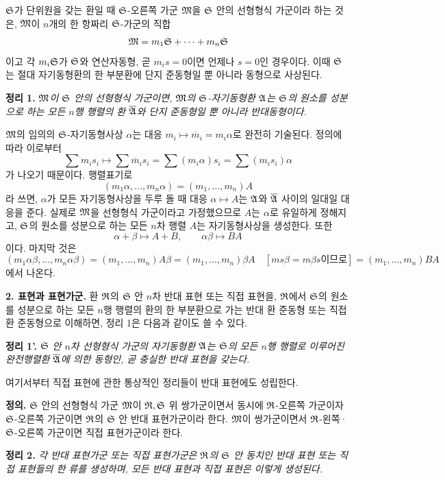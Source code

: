 \(\mathfrak S\)가 단위원을 갖는 환일 때 \(\mathfrak S\)-오른쪽 가군 \(\mathfrak M\)을 \(\mathfrak S\) 안의 선형형식 가군이라 하는 것은, \(\mathfrak M\)이 \(n\)개의 한 항짜리 \(\mathfrak S\)-가군의 직합
\[
\mathfrak M=m_1\mathfrak S+\cdots+m_n\mathfrak S
\]
이고 각 \(m_i\mathfrak S\)가 \(\mathfrak S\)와 연산자동형, 곧 \(m_i s=0\)이면 언제나 \(s=0\)인 경우이다. 이때 \(\mathfrak S\)는 절대 자기동형환의 한 부분환에 단지 준동형일 뿐 아니라 동형으로 사상된다.

\noindent\textbf{정리 1.} \emph{\(\mathfrak M\)이 \(\mathfrak S\) 안의 선형형식 가군이면, \(\mathfrak M\)의 \(\mathfrak S\)-자기동형환 \(\mathfrak A\)는 \(\mathfrak S\)의 원소를 성분으로 하는 모든 \(n\)행 행렬의 환 \(\overline{\mathfrak A}\)와 단지 준동형일 뿐 아니라 반대동형이다.}

\(\mathfrak M\)의 임의의 \(\mathfrak S\)-자기동형사상 \(\alpha\)는 대응 \(m_i\mapsto\overline m_i=m_i\alpha\)로 완전히 기술된다. 정의에 따라 이로부터
\[
\sum m_i s_i\longmapsto
\sum\overline m_i s_i
=\sum(m_i\alpha)s_i
=\sum(m_i s_i)\alpha
\]
가 나오기 때문이다. 행렬표기로
\[
(m_1\alpha,\ldots,m_n\alpha)=(m_1,\ldots,m_n)A
\]
라 쓰면, \(\alpha\)가 모든 자기동형사상을 두루 돌 때 대응 \(\alpha\mapsto A\)는 \(\mathfrak A\)와 \(\overline{\mathfrak A}\) 사이의 일대일 대응을 준다. 실제로 \(\mathfrak M\)을 선형형식 가군이라고 가정했으므로 \(A\)는 \(\alpha\)로 유일하게 정해지고, \(\mathfrak S\)의 원소를 성분으로 하는 모든 \(n\)차 행렬 \(A\)는 자기동형사상을 생성한다. 또한
\[
\alpha+\beta\mapsto A+B,\qquad
\alpha\beta\mapsto BA
\]
이다. 마지막 것은
\[
(m_1\alpha\beta,\ldots,m_n\alpha\beta)
=(m_1,\ldots,m_n)A\beta
=(m_1,\ldots,m_n)\beta A
\quad[\text{\(ms\beta=m\beta s\)이므로}]
=(m_1,\ldots,m_n)BA
\]
에서 나온다.

\noindent\textbf{2. 표현과 표현가군.} 환 \(\mathfrak R\)의 \(\mathfrak S\) 안 \(n\)차 반대 표현 또는 직접 표현을, \(\mathfrak R\)에서 \(\mathfrak S\)의 원소를 성분으로 하는 모든 \(n\)행 행렬의 환의 한 부분환으로 가는 반대 환 준동형 또는 직접 환 준동형으로 이해하면, 정리 1은 다음과 같이도 쓸 수 있다.

\noindent\textbf{정리 1'.} \emph{\(\mathfrak S\) 안 \(n\)차 선형형식 가군의 자기동형환 \(\mathfrak A\)는 \(\mathfrak S\)의 모든 \(n\)행 행렬로 이루어진 완전행렬환 \(\overline{\mathfrak A}\)에 의한 동형인, 곧 충실한 반대 표현을 갖는다.}

여기서부터 직접 표현에 관한 통상적인 정리들이 반대 표현에도 성립한다.

\noindent\textbf{정의.} \(\mathfrak S\) 안의 선형형식 가군 \(\mathfrak M\)이 \(\mathfrak R,\mathfrak S\) 위 쌍가군이면서 동시에 \(\mathfrak R\)-오른쪽 가군이자 \(\mathfrak S\)-오른쪽 가군이면 \(\mathfrak R\)의 \(\mathfrak S\) 안 반대 표현가군이라 한다. \(\mathfrak M\)이 쌍가군이면서 \(\mathfrak R\)-왼쪽·\(\mathfrak S\)-오른쪽 가군이면 직접 표현가군이라 한다.

\noindent\textbf{정리 2.} \emph{각 반대 표현가군 또는 직접 표현가군은 \(\mathfrak R\)의 \(\mathfrak S\) 안 동치인 반대 표현 또는 직접 표현들의 한 류를 생성하며, 모든 반대 표현과 직접 표현은 이렇게 생성된다.}

